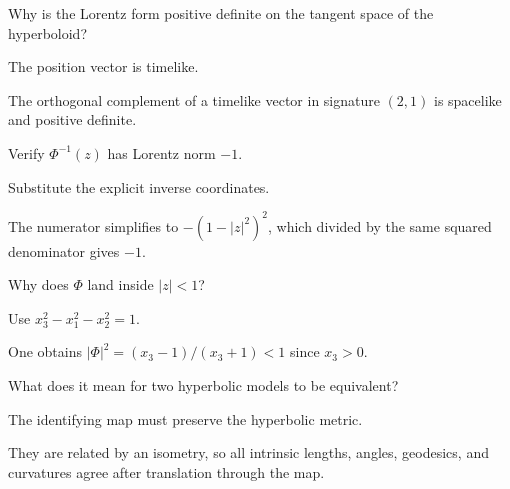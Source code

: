 \begin{exercise}\label{exr:vii31-ped-06}
Why is the Lorentz form positive definite on the tangent space of the hyperboloid?
\end{exercise}

\begin{hint}
The position vector is timelike.
\end{hint}

\begin{solution}
The orthogonal complement of a timelike vector in signature \((2,1)\) is spacelike and positive definite.
\end{solution}

\begin{exercise}\label{exr:vii31-ped-07}
Verify \(\Phi^{-1}(z)\) has Lorentz norm \(-1\).
\end{exercise}

\begin{hint}
Substitute the explicit inverse coordinates.
\end{hint}

\begin{solution}
The numerator simplifies to \(-\left(1-|z|^2\right)^2\), which divided by the same squared denominator gives \(-1\).
\end{solution}

\begin{exercise}\label{exr:vii31-ped-08}
Why does \(\Phi\) land inside \(|z|<1\)?
\end{exercise}

\begin{hint}
Use \(x_3^2-x_1^2-x_2^2=1\).
\end{hint}

\begin{solution}
One obtains \(|\Phi|^2=(x_3-1)/(x_3+1)<1\) since \(x_3>0\).
\end{solution}

\begin{exercise}\label{exr:vii31-ped-09}
What does it mean for two hyperbolic models to be equivalent?
\end{exercise}

\begin{hint}
The identifying map must preserve the hyperbolic metric.
\end{hint}

\begin{solution}
They are related by an isometry, so all intrinsic lengths, angles, geodesics, and curvatures agree after translation through the map.
\end{solution}

